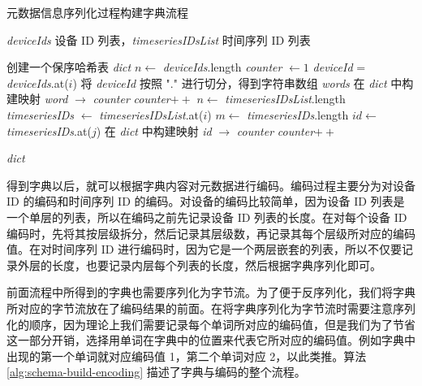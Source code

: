 \begin{algorithm}
  \caption{元数据信息序列化过程构建字典流程}
  \label{alg:schema-build-dict}
  \small
  \begin{algorithmic}
    \REQUIRE \emph{deviceIds} 设备 ID 列表，\emph{timeseriesIDsList} 时间序列 ID 列表

    \STATE 创建一个保序哈希表 \emph{dict}
    \STATE $n\leftarrow$ \emph{deviceIds}.length
    \STATE \emph{counter} $\leftarrow 1$
      \STATE \emph{deviceId} = \emph{deviceIds}.at($i$)
      \STATE 将 \emph{deviceId} 按照 "." 进行切分，得到字符串数组 \emph{words}
          \STATE 在 \emph{dict} 中构建映射 \emph{word} $\rightarrow$ \emph{counter}
          \STATE \emph{counter}$++$
        \ENDIF
      \ENDFOR
    \ENDFOR
    \STATE $n \leftarrow$ \emph{timeseriesIDsList}.length
      \STATE \emph{timeseriesIDs} $\leftarrow$ \emph{timeseriesIDsList}.at($i$)
      \STATE $m \leftarrow$ \emph{timeseriesIDs}.length
        \STATE $id \leftarrow$ \emph{timeseriesIDs}.at($j$)
          \STATE 在 \emph{dict} 中构建映射 \emph{id} $\rightarrow$ \emph{counter}
          \STATE \emph{counter}$++$
        \ENDIF
      \ENDFOR
    \ENDFOR

    \RETURN \emph{dict}

  \end{algorithmic}
\end{algorithm}

得到字典以后，就可以根据字典内容对元数据进行编码。编码过程主要分为对设备 ID 的编码和时间序列 ID 的编码。对设备的编码比较简单，因为设备 ID 列表是一个单层的列表，所以在编码之前先记录设备 ID 列表的长度。在对每个设备 ID 编码时，先将其按层级拆分，然后记录其层级数，再记录其每个层级所对应的编码值。在对时间序列 ID 进行编码时，因为它是一个两层嵌套的列表，所以不仅要记录外层的长度，也要记录内层每个列表的长度，然后根据字典序列化即可。

前面流程中所得到的字典也需要序列化为字节流。为了便于反序列化，我们将字典所对应的字节流放在了编码结果的前面。在将字典序列化为字节流时需要注意序列化的顺序，因为理论上我们需要记录每个单词所对应的编码值，但是我们为了节省这一部分开销，选择用单词在字典中的位置来代表它所对应的编码值。例如字典中出现的第一个单词就对应编码值 1，第二个单词对应 2，以此类推。算法 \ref{alg:schema-build-encoding} 描述了字典与编码的整个流程。

